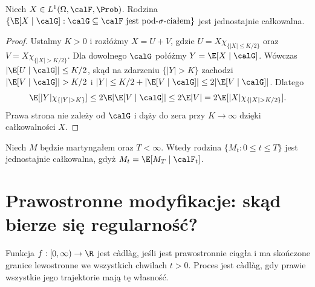 \begin{lemat}
\label{lem:mart-cont-ui-cond}
Niech $X\in L^1(\Omega,\calF,\Prob)$. Rodzina
$\{\E[X\mid\calG]:\calG\subseteq\calF\text{ jest pod-}\sigma\text{-ciałem}\}$
jest jednostajnie całkowalna.
\end{lemat}
\begin{proof}
Ustalmy $K>0$ i rozłóżmy $X=U+V$, gdzie
$U=X\chi_{\{|X|\le K/2\}}$ oraz
$V=X\chi_{\{|X|>K/2\}}$. Dla dowolnego $\calG$
połóżmy $Y=\E[X\mid\calG]$. Wówczas
$|\E[U\mid\calG]|\le K/2$, skąd na zdarzeniu
$\{|Y|>K\}$ zachodzi $|\E[V\mid\calG]|>K/2$
i $|Y|\le K/2+|\E[V\mid\calG]|\le2|\E[V\mid\calG]|$.
Dlatego
\[
\E[|Y|\chi_{\{|Y|>K\}}]
\le2\E|\E[V\mid\calG]|
\le2\E|V|
=2\E[|X|\chi_{\{|X|>K/2\}}].
\]
Prawa strona nie zależy od $\calG$ i dąży do zera
przy $K\to\infty$ dzięki całkowalności $X$.
\end{proof}

\begin{wniosek}
Niech $M$ będzie martyngałem oraz $T<\infty$.
Wtedy rodzina $\{M_t:0\le t\le T\}$ jest jednostajnie
całkowalna, gdyż $M_t=\E[M_T\mid\calF_t]$.
\end{wniosek}

\section{Prawostronne modyfikacje: skąd bierze się regularność?}
\begin{definicja}
Funkcja $f:[0,\infty)\to\R$ jest c\`adl\`ag, jeśli
jest prawostronnie ciągła i ma skończone granice lewostronne
we wszystkich chwilach $t>0$. Proces jest c\`adl\`ag,
gdy prawie wszystkie jego trajektorie mają tę własność.
\end{definicja}

